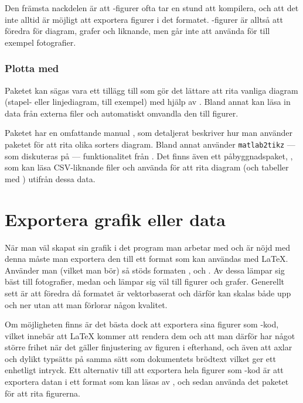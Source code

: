 \documentclass[10pt,../../a4.tex]{subfiles}
\begin{document}
Den främsta nackdelen är att \PGFTikZ-figurer ofta tar en stund att
kompilera, och att det inte alltid är möjligt att exportera figurer
i det formatet. \PGFTikZ-figurer är alltså att föredra för diagram,
grafer och liknande, men går inte att använda för till exempel
fotografier.

\subsubsection{Plotta med }
Paketet  kan sägas vara ett tillägg till \PGFTikZ som gör
det lättare att rita vanliga diagram (stapel- eller linjediagram, till
exempel) med hjälp av \PGFTikZ. Bland annat kan  läsa in
data från externa filer och automatiskt omvandla den till figurer.

Paketet har en omfattande manual \parencite{Feuersanger13a}, som
detaljerat beskriver hur man använder paketet för att rita olika
sorters diagram.
Bland annat använder \texttt{matlab2tikz} — som diskuteras på
 — funktionalitet från .
Det finns även ett påbyggnadspaket, 
\parencite{Feuersanger13b}, som kan läsa
CSV-liknande filer och använda  för att rita diagram
(och tabeller med ) utifrån dessa data.

\section{Exportera grafik eller data}
När man väl skapat sin grafik i det program man arbetar med och är nöjd
med denna måste man exportera den till ett format som kan användas med
\LaTeX. Använder man \pdfLaTeX{} (vilket man bör) så stöds formaten \JPEG,
\PNG och \PDF. Av dessa lämpar sig \JPEG bäst till fotografier, medan
\PNG och \PDF lämpar sig väl till figurer och grafer.
Generellt sett är \PDF att föredra då formatet är vektorbaserat och
därför kan skalas både upp och ner utan att man förlorar någon kvalitet.

Om möjligheten finns är det bästa dock att exportera sina figurer som
\PGFTikZ-kod, vilket innebär att \LaTeX{} kommer att rendera dem och att
man därför har något större frihet när det gäller finjustering av figuren
i efterhand, och även att axlar och dylikt typsätts på samma sätt som
dokumentets brödtext vilket ger ett enhetligt intryck. Ett alternativ
till att exportera hela figurer som \PGFTikZ-kod är att exportera datan
i ett format som kan läsas av , och sedan använda det
paketet för att rita figurerna.
\end{document}
